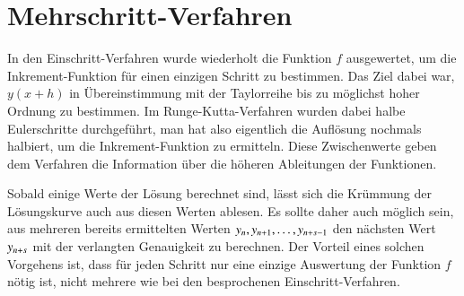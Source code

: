 %
%
%
\section{Mehrschritt-Verfahren}
In den Einschritt-Verfahren wurde wiederholt die Funktion $f$ ausgewertet,
um die Inkrement-Funk\-tion für einen einzigen Schritt zu bestimmen.
Das Ziel dabei war, $y(x+h)$ in Übereinstimmung mit der Taylorreihe
bis zu möglichst hoher Ordnung zu bestimmen.
Im Runge-Kutta-Verfahren wurden dabei halbe Eulerschritte durchgeführt,
man hat also eigentlich die Auflösung nochmals halbiert, um die
Inkrement-Funktion zu ermitteln.
Diese Zwischenwerte geben dem Verfahren die Information über die
höheren Ableitungen der Funktionen.

Sobald einige Werte der Lösung berechnet sind, lässt sich die Krümmung
der Lösungskurve auch aus diesen Werten ablesen.
Es sollte daher auch möglich sein, aus mehreren bereits
ermittelten Werten $y_{n\mathstrut},y_{n+1},\dots,y_{n+s-1}$
den nächsten Wert $y_{n+s\mathstrut}$ mit der verlangten Genauigkeit
zu berechnen.
Der Vorteil eines solchen Vorgehens ist, dass für jeden Schritt nur 
eine einzige Auswertung der Funktion $f$ nötig ist,
nicht mehrere wie bei den besprochenen Einschritt-Verfahren.

